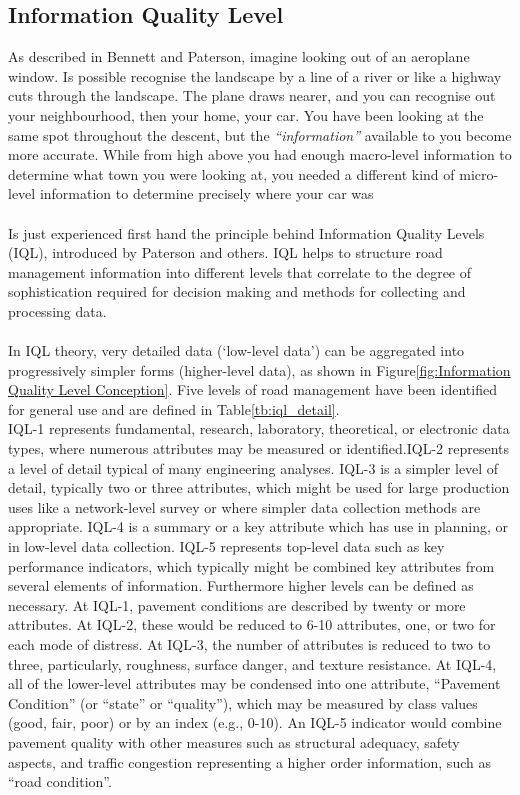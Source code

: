 \documentclass[tesi]{subfiles}
\begin{document}
\subsection{Information Quality Level}\label{ssc:Information Quality Level}
\noindent As described in Bennett and Paterson\cite{bennett2000guide}, imagine looking out of an aeroplane window. Is possible recognise the landscape by a line of a river or like a highway cuts through the landscape. The plane draws nearer, and you can recognise out your neighbourhood, then your home, your car. You have been looking at the same spot throughout the descent, but the \textit{“information”} available to you become more accurate. While from high above you had enough macro-level information to determine what town you were looking at, you needed a different kind of micro-level information to determine precisely where your car was
\\\\
Is just experienced first hand the principle behind Information Quality Levels (IQL), introduced by Paterson and others\cite{paterson2}. IQL helps to structure road management information into different levels that correlate to the degree of sophistication required for decision making and methods for collecting and processing data.
\\\\
\noindent In IQL theory, very detailed data (‘low-level data’) can be aggregated into progressively simpler forms (higher-level data), as shown in Figure\ref{fig:Information Quality Level Conception}. Five levels of road management have been identified for general use and are defined in Table\ref{tb:iql_detail}.
\\
\noindent IQL-1 represents fundamental, research, laboratory, theoretical, or electronic data types, where numerous attributes may be measured or identified.IQL-2 represents a level of detail typical of many engineering analyses.
IQL-3 is a simpler level of detail, typically two or three attributes, which might be used for large production uses like a network-level survey or where simpler data collection methods are appropriate.
IQL-4 is a summary or a key attribute which has use in planning, or in low-level data collection.
IQL-5 represents top-level data such as key performance indicators, which typically might be combined key attributes from several elements of information. Furthermore higher levels can be defined as necessary. 
At IQL-1, pavement conditions are described by twenty or more attributes.
At IQL-2, these would be reduced to 6-10 attributes, one, or two for each mode of distress.
 At IQL-3, the number of attributes is reduced to two to three, particularly, roughness, surface danger, and texture resistance.
At IQL-4, all of the lower-level attributes may be condensed into one attribute, “Pavement Condition” (or “state” or “quality”), which may be measured by class values (good, fair, poor) or by an index (e.g., 0-10).
An IQL-5 indicator would combine pavement quality with other measures such as structural adequacy, safety aspects, and traffic congestion representing a higher order information, such as “road condition”.\\
\end{document}
